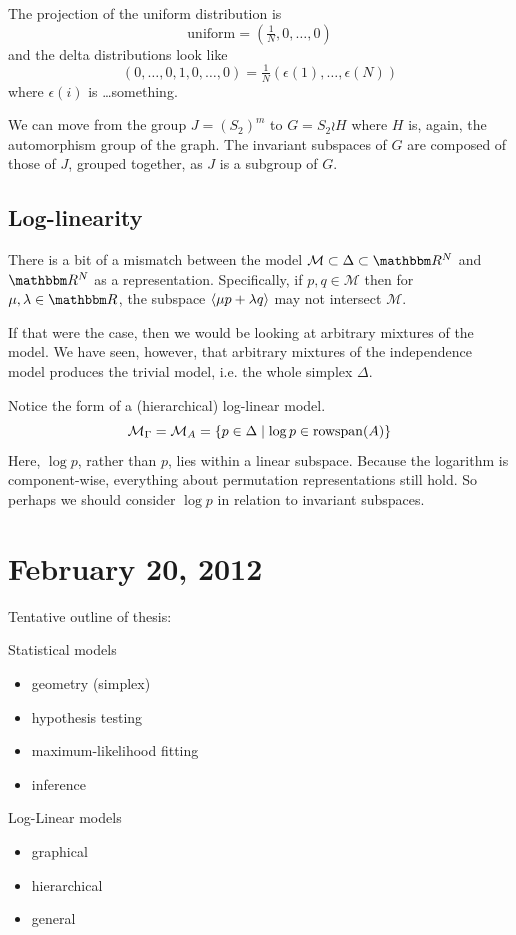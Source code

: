 \documentclass[12pt]{article}
\newcommand*{\ms}{\mathcal{M}}
\begin{document}
The projection of the uniform distribution is
\[
    \mathrm{uniform} = (\tfrac 1 N, 0, \ldots, 0)
\]
and the delta distributions look like
\[
    (0, \ldots, 0, 1, 0, \ldots, 0)
    = \tfrac 1 N (\epsilon(1), \ldots, \epsilon(N))
\]
where $\epsilon(i)$ is \ldots something.

We can move from the group $J = (S_2)^m$ to $G = S_2 \wr H$ where $H$ is, again, the
automorphism group of the graph.  The invariant subspaces of $G$ are composed of
those of $J$, grouped together, as $J$ is a subgroup of $G$.

\subsection{Log-linearity}

There is a bit of a mismatch between the model $\ms \subset \Delta \subset \R^N$
and $\R^N$ as a representation.  Specifically, if $p, q \in \ms$ then for $\mu,
\lambda \in \R$, the subspace $\langle\mu p + \lambda q\rangle$ may not intersect $\ms$.

If that were the case, then we would be looking at arbitrary mixtures of the
model.  We have seen, however, that arbitrary mixtures of the independence model
produces the trivial model, i.e. the whole simplex $\Delta$.

Notice the form of a (hierarchical) log-linear model.
\[
    \ms_\Gamma = \ms_A = \cdel*{
        p \in \Delta \mid \log p \in \mathrm{rowspan}(A)
    }
\]
Here, $\log p$, rather than $p$, lies within a linear subspace.  Because the
logarithm is component-wise, everything about permutation representations still
hold.  So perhaps we should consider $\log p$ in relation to invariant
subspaces.

\section{February 20, 2012}

Tentative outline of thesis:
\lspace

\noindent Statistical models
\begin{itemize}\nospace
\item geometry (simplex)
\item hypothesis testing
\item maximum-likelihood fitting
\item inference
\end{itemize}

\noindent Log-Linear models
\begin{itemize}\nospace
\item graphical
\item hierarchical
\item general
\end{itemize}
\end{document}
